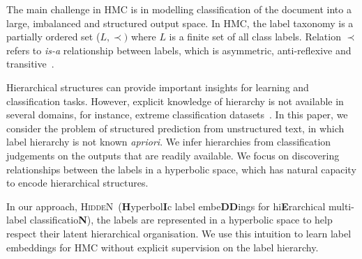 \documentclass[11pt,a4paper]{article}
\newcommand{\model}{\mbox{\textsc{HiddeN}}}
\begin{document}
The main challenge in HMC is in modelling classification of the document into a large, imbalanced and structured output space. In HMC, the label taxonomy is a partially ordered set ($L, \prec)$ where $L$ is a finite set of all class labels. Relation $\prec$ refers to \textit{is-a} relationship between labels, which is asymmetric, anti-reflexive and transitive~\citep{survey}.

Hierarchical structures can provide important insights for learning and classification tasks. However, explicit knowledge of hierarchy is not available in several domains, for instance, extreme classification datasets~\cite{extreme}. In this paper, we consider the problem of structured prediction from unstructured text, in which label hierarchy is not known \textit{apriori}. We infer hierarchies from classification judgements on the outputs that are readily available. We focus on discovering relationships between the labels in a hyperbolic space, which has natural capacity to encode hierarchical structures.

In our approach, \model\ (\textbf{H}yperbol\textbf{I}c label embe\textbf{DD}ings for hi\textbf{E}rarchical multi-label classificatio\textbf{N}), the labels are represented in a hyperbolic space to help respect their latent hierarchical organisation. We use this intuition to learn label embeddings for HMC without explicit supervision on the label hierarchy.
\end{document}
